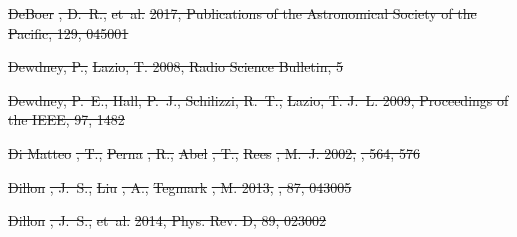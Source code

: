 \documentclass[numberedappendix]{emulateapj}
\providecommand{\DIFdel}[1]{{\protect\color{red}\sout{#1}}}                      %
\begin{document}
\DIFdel{DeBoer}%
\DIFdel{, D.~R., }%
\DIFdel{et~al.}%
\DIFdel{2017, Publications of the Astronomical Society of the
  Pacific, 129, 045001
}%

\DIFdel{Dewdney, P., }%
\DIFdel{Lazio, T. 2008, Radio Science Bulletin, 5
}%

\DIFdel{Dewdney, P.~E., Hall, P.~J., Schilizzi, R.~T., }%
\DIFdel{Lazio, T. J.~L. 2009,
  Proceedings of the IEEE, 97, 1482
}%

\DIFdel{Di Matteo}%
\DIFdel{, T., }%
\DIFdel{Perna}%
\DIFdel{, R., }%
\DIFdel{Abel}%
\DIFdel{, T., }%
\DIFdel{Rees}%
\DIFdel{, M.~J. 2002, }%
\DIFdel{, 564, 576
}%

\DIFdel{Dillon}%
\DIFdel{, J.~S., }%
\DIFdel{Liu}%
\DIFdel{, A., }%
\DIFdel{Tegmark}%
\DIFdel{, M. 2013, }%
\DIFdel{, 87, 043005
}%

\DIFdel{Dillon}%
\DIFdel{, J.~S., }%
\DIFdel{et~al.}%
\DIFdel{2014, Phys. Rev. D, 89, 023002
}%
\end{document}
